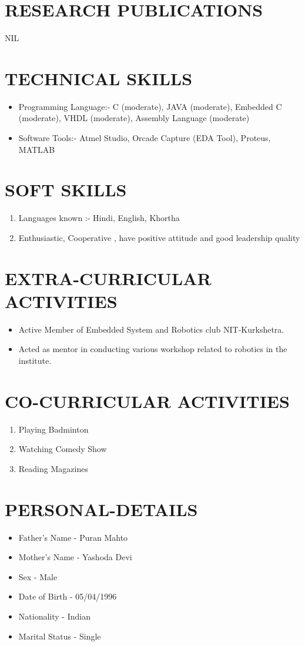 \documentclass[11pt,a4paper,sans]{moderncv}
\begin{document}
\section{RESEARCH PUBLICATIONS}
NIL 
\newline \newline
\section{TECHNICAL SKILLS}
\begin{itemize}
\item Programming Language:- C (moderate), JAVA (moderate), Embedded C (moderate),  VHDL (moderate), Assembly Language (moderate)
\item Software Tools:- Atmel Studio,  Orcade Capture (EDA Tool), Proteus, MATLAB
\end{itemize}
\section{SOFT SKILLS}
\begin{enumerate}
\item Languages known :- Hindi, English, Khortha
\item Enthusiastic, Cooperative , have positive attitude and good leadership quality
\end{enumerate}

\section{EXTRA-CURRICULAR ACTIVITIES}
\begin{itemize}
\item Active Member of Embedded System and Robotics club NIT-Kurkshetra.
\item Acted as mentor in conducting various workshop related to robotics in the institute. 
\end{itemize}
\section{CO-CURRICULAR ACTIVITIES}
\begin{enumerate}
\item Playing Badminton
\item Watching Comedy Show
\item Reading Magazines
\end{enumerate}
\section{PERSONAL-DETAILS}
\begin{itemize}
\item Father's Name - Puran Mahto
\item Mother's Name - Yashoda Devi
\item Sex - Male
\item Date of Birth - 05/04/1996
\item Nationality - Indian
\item Marital Status - Single
\end{itemize}




\clearpage
\end{document}
